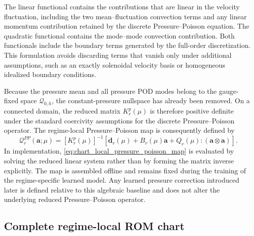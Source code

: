 The linear functional contains the contributions that are linear in the
velocity fluctuation, including the two mean--fluctuation convection terms
and any linear momentum contribution retained by the discrete
Pressure--Poisson equation.  The quadratic functional contains the
mode--mode convection contribution.  Both functionals include the boundary
terms generated by the full-order discretization.  This formulation avoids
discarding terms that vanish only under additional assumptions, such as an
exactly solenoidal velocity basis or homogeneous idealized boundary
conditions.

Because the pressure mean and all pressure POD modes belong to the
gauge-fixed space $\mathcal{Q}_{0,h}$, the constant-pressure nullspace has
already been removed.  On a connected domain, the reduced matrix
$K_r^p(\mu)$ is therefore positive definite under the standard coercivity
assumptions for the discrete Pressure--Poisson operator.  The regime-local
Pressure--Poisson map is consequently defined by
\begin{equation}
  \mathscr{Q}^{PP}_r(\boldsymbol{a};\mu)
  =
  [K_r^p(\mu)]^{-1}
  \left[
    \boldsymbol{d}_r(\mu)
    +B_r(\mu)\boldsymbol{a}
    +Q_r(\mu):
     (\boldsymbol{a}\otimes\boldsymbol{a})
  \right].
  \label{eq:chart_local_pressure_poisson_map}
\end{equation}
In implementation, \eqref{eq:chart_local_pressure_poisson_map} is evaluated
by solving the reduced linear system rather than by forming the matrix
inverse explicitly.  The map is assembled offline and remains fixed during
the training of the regime-specific learned model.  Any learned pressure
correction introduced later is defined relative to this algebraic baseline
and does not alter the underlying reduced Pressure--Poisson operator.

\subsection{Complete regime-local ROM chart}
\label{subsec:complete_regime_local_rom_chart}

